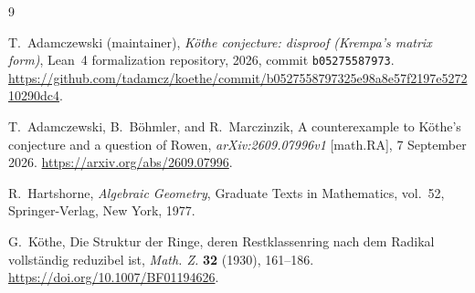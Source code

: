 \documentclass[11pt]{article}
\begin{document}
\begin{thebibliography}{9}

T.~Adamczewski (maintainer),
\emph{K\"othe conjecture: disproof (Krempa's matrix form)},
Lean~4 formalization repository, 2026, commit \texttt{b05275587973}.
\url{https://github.com/tadamcz/koethe/commit/b0527558797325e98a8e57f2197e527210290dc4}.

T.~Adamczewski, B.~B\"ohmler, and R.~Marczinzik,
A counterexample to K\"othe's conjecture and a question of Rowen,
\emph{arXiv:2609.07996v1} [math.RA], 7 September 2026.
\url{https://arxiv.org/abs/2609.07996}.

R.~Hartshorne,
\emph{Algebraic Geometry},
Graduate Texts in Mathematics, vol.~52,
Springer-Verlag, New York, 1977.

G.~K\"othe,
Die Struktur der Ringe, deren Restklassenring nach dem Radikal vollst\"andig reduzibel ist,
\emph{Math. Z.} \textbf{32} (1930), 161--186.
\url{https://doi.org/10.1007/BF01194626}.

\end{thebibliography}
\end{document}
